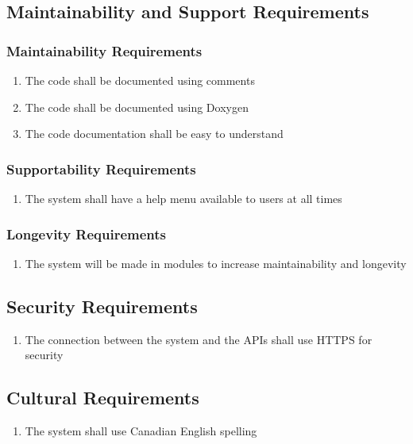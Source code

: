 \documentclass[12pt, titlepage]{article}
\begin{document}
\subsection{Maintainability and Support Requirements}
\subsubsection{Maintainability Requirements}
\begin{enumerate}[start=1, label={MS\arabic*.}]
    \item The code shall be documented using comments
    \item The code shall be documented using Doxygen
    \item The code documentation shall be easy to understand
\end{enumerate}
\subsubsection{Supportability Requirements}
\begin{enumerate}[start=4, label={MS\arabic*.}]
    \item The system shall have a help menu available to users at all times
\end{enumerate}
\subsubsection{Longevity Requirements}
\begin{enumerate}[start=5, label={MS\arabic*.}]
	\item The system will be made in modules to increase maintainability and longevity
\end{enumerate}

\subsection{Security Requirements}
\begin{enumerate}[start=1, label={S\arabic*.}]
    \item The connection between the system and the APIs shall use HTTPS for security
\end{enumerate}

\subsection{Cultural Requirements}
\begin{enumerate}[start=1, label={C\arabic*.}]
    \item The system shall use Canadian English spelling
\end{enumerate}
\end{document}
